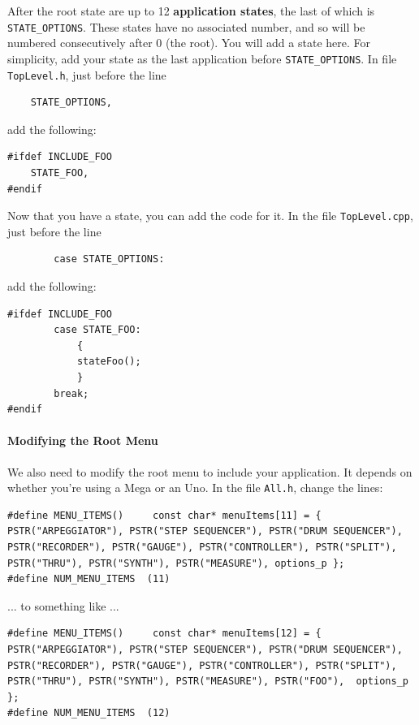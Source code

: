 \documentclass{article}
\begin{document}
After the root state are up to 12 {\bf application states}, the last of which is \texttt{STATE\_OPTIONS}.  These states have no associated number, and so will be numbered consecutively after 0 (the root).  You will add a state here.  For simplicity, add your state as the last application before \texttt{STATE\_OPTIONS}.  In file \texttt{TopLevel.h}, just before the line

\begin{verbatim}
    STATE_OPTIONS,
\end{verbatim}

add the following:

\begin{verbatim}
#ifdef INCLUDE_FOO
    STATE_FOO,
#endif
\end{verbatim}

Now that you have a state, you can add the code for it.  In the file \texttt{TopLevel.cpp}, just before the line

\begin{verbatim}
        case STATE_OPTIONS:
\end{verbatim}

add the following:

\begin{verbatim}
#ifdef INCLUDE_FOO
        case STATE_FOO:
            {
            stateFoo();
            }
        break;
#endif
\end{verbatim}

\paragraph{Modifying the Root Menu}

We also need to modify the root menu to include your application.  It depends on whether you're using a Mega or an Uno.  In the file \texttt{All.h}, change the lines:

\begin{verbatim}
#define MENU_ITEMS()     const char* menuItems[11] = { PSTR("ARPEGGIATOR"), PSTR("STEP SEQUENCER"), PSTR("DRUM SEQUENCER"), PSTR("RECORDER"), PSTR("GAUGE"), PSTR("CONTROLLER"), PSTR("SPLIT"), PSTR("THRU"), PSTR("SYNTH"), PSTR("MEASURE"), options_p };
#define NUM_MENU_ITEMS  (11)
\end{verbatim}

... to something like ...

\begin{verbatim}
#define MENU_ITEMS()     const char* menuItems[12] = { PSTR("ARPEGGIATOR"), PSTR("STEP SEQUENCER"), PSTR("DRUM SEQUENCER"), PSTR("RECORDER"), PSTR("GAUGE"), PSTR("CONTROLLER"), PSTR("SPLIT"), PSTR("THRU"), PSTR("SYNTH"), PSTR("MEASURE"), PSTR("FOO"),  options_p };
#define NUM_MENU_ITEMS  (12)
\end{verbatim}
\end{document}
